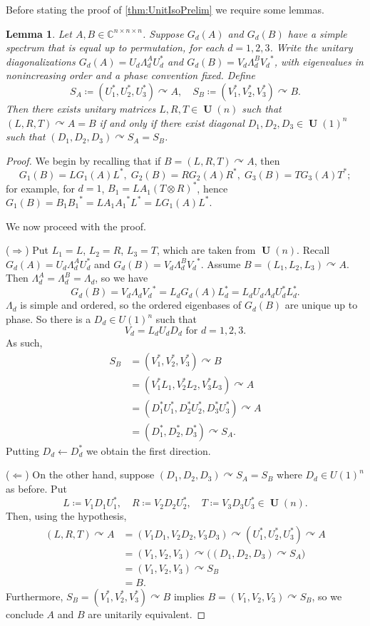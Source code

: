 \documentclass[11pt]{article}
\numberwithin{equation}{section}
\newtheorem{lemma}[theorem]{Lemma}
\theoremstyle{remark}
\DeclareMathOperator{\Unitary}{\textbf{U}}
\newcommand{\CC}{\mathbb{C}}
\begin{document}
Before stating the proof of \cref{thm:UnitIsoPrelim} we require some lemmas.

\begin{lemma}\label{lem:fundamentalCondition}
Let $A,B \in \CC^{n\times n \times n}$. Suppose $G_d(A)$ and $G_d(B)$ have a simple spectrum that is equal up to permutation, for each $d=1,2,3$.  Write the unitary diagonalizations $G_d(A)=U_d\Lambda^A_d U_d^*$ and $G_d(B)=V_d\Lambda^B_d {V_d}^*$, with eigenvalues in nonincreasing order and a phase convention fixed. Define
\[
S_A\coloneqq (U_1^*, U_2^*, U_3^*) \curvearrowright A,\quad
S_B\coloneqq (V_1^*, V_2^*, V_3^*) \curvearrowright B.
\]
Then there exists unitary matrices $L, R, T \in \Unitary(n)$ such that $(L, R, T) \curvearrowright A = B$ if and only if there exist diagonal $D_1,D_2,D_3 \in \Unitary(1)^n$ such that $(D_1,D_2,D_3)\curvearrowright S_A = S_B$.
\end{lemma}
\begin{proof}
We begin by recalling that if $B=(L,R,T)\curvearrowright A$, then
\[
G_1(B)=LG_1(A)L^*,\;
G_2(B)=RG_2(A)R^*,\;
G_3(B)=TG_3(A)T^*;
\]
for example, for $d=1$, $B_{1}=LA_{1}(T\otimes R)^*$, hence $G_1(B)=B_{1}{B_{1}}^*=LA_{1}{A_{1}}^* L^*=LG_1(A)L^*$.

We now proceed with the proof.

($\Longrightarrow$) Put $L_1=L$, $L_2=R$, $L_3=T$, which are taken from $\Unitary(n)$. Recall $G_d(A)=U_d\Lambda^A_d U_d^*$ and $G_d(B)=V_d\Lambda^B_d {V_d}^*$.
Assume $B=(L_1,L_2,L_3)\curvearrowright A$. Then $\Lambda^A_d = \Lambda^B_d = \Lambda_d$, so we have
\[
G_d(B)=V_d\Lambda_d {V_d}^* =L_d G_d(A) L_d^* = L_d U_d\Lambda_d U_d^* L_d^*.
\]
$\Lambda_d$ is simple and ordered, so the ordered eigenbases of $G_d(B)$ are unique up to phase. So there is a $D_d \in U(1)^n$ such that 
\[
V_d = L_d U_d D_d \text{ for } d=1,2,3.
\]
As such,
\begin{align*}
S_B&=(V_1^*,V_2^*,V_3^*)\curvearrowright B\\
&=(V_1^* L_1,V_2^* L_2,V_3^* L_3)\curvearrowright A\\
&=(D_1^* U_1^*,D_2^* U_2^* ,D_3^* U_3^*)\curvearrowright A\\
&=(D_1^*,D_2^*,D_3^*)\curvearrowright S_A.
\end{align*}
Putting $D_d \leftarrow D_d^*$ we obtain the first direction.

($\Longleftarrow$) On the other hand, suppose $(D_1,D_2,D_3)\curvearrowright S_A=S_B$ where $D_d \in U(1)^n$ as before. Put
\[
L\coloneqq V_1 D_1 U_1^*,\quad R\coloneqq V_2 D_2 U_2^*,\quad T \coloneqq V_3 D_3 U_3^*\in \Unitary(n).
\]
Then, using the hypothesis,
\begin{align*}
(L,R,T)\curvearrowright A
&=(V_1D_1,V_2D_2,V_3D_3)\curvearrowright (U_1^*,U_2^*,U_3^*)\curvearrowright A\\
&=(V_1,V_2,V_3)\curvearrowright \big((D_1,D_2,D_3)\curvearrowright S_A\big)\\
&=(V_1,V_2,V_3)\curvearrowright S_B\\
&=B.
\end{align*}
Furthermore, $S_B=(V_1^*,V_2^*,V_3^*)\curvearrowright B$ implies $B=(V_1,V_2,V_3)\curvearrowright S_B$, so we conclude $A$ and $B$ are unitarily equivalent.
\end{proof}
\end{document}
